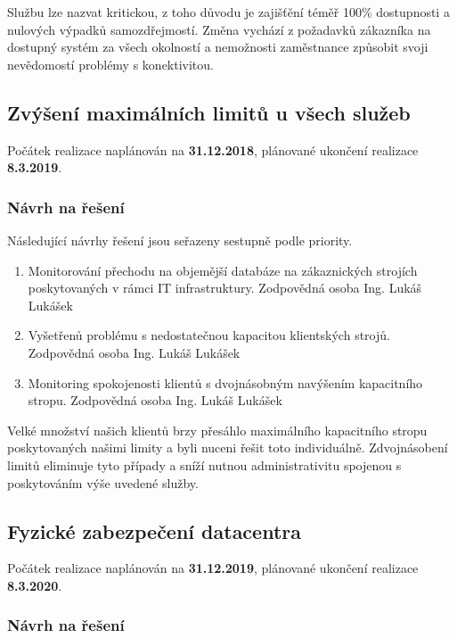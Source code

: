 \documentclass[11pt, a4paper, titlepage]{article}
\begin{document}
	Službu lze nazvat kritickou, z toho důvodu je zajišťění téměř 100\% dostupnosti a nulových výpadků samozdřejmostí. Změna vychází z požadavků zákazníka na dostupný systém za všech okolností a nemožnosti zaměstnance způsobit svoji nevědomostí problémy s konektivitou.

	\subsection{Zvýšení maximálních limitů u všech služeb}

	Počátek realizace naplánován na \textbf{31.12.2018}, plánované ukončení realizace \textbf{8.3.2019}.

	\subsubsection{Návrh na řešení}

	Následující návrhy řešení jsou seřazeny sestupně podle priority.

	\begin{enumerate}
		\item Monitorování přechodu na objemější databáze na zákaznických strojích poskytovaných v rámci IT infrastruktury. Zodpovědná osoba Ing. Lukáš Lukášek
	 	\item Vyšetřenů problému s nedostatečnou kapacitou klientských strojů. Zodpovědná osoba Ing. Lukáš Lukášek
	 	\item Monitoring spokojenosti klientů s dvojnásobným navýšením kapacitního stropu. Zodpovědná osoba Ing. Lukáš Lukášek
	\end{enumerate}

	Velké množství našich klientů brzy přesáhlo maximálního kapacitního stropu poskytovaných našimi limity a byli nuceni řešit toto individuálně. Zdvojnásobení limitů eliminuje tyto případy a sníží nutnou administrativitu spojenou s poskytováním výše uvedené služby.

	\subsection{Fyzické zabezpečení datacentra}

	Počátek realizace naplánován na \textbf{31.12.2019}, plánované ukončení realizace \textbf{8.3.2020}.

	\subsubsection{Návrh na řešení}
\end{document}
